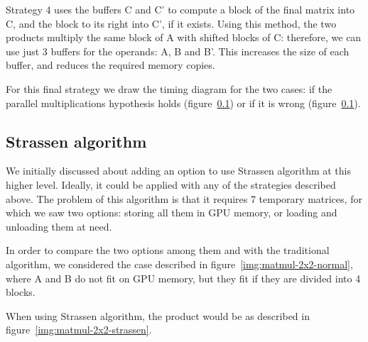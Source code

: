 Strategy 4 uses the buffers C and C' to compute a block of the final matrix into C, and the block to its right into C', if it exists.
Using this method, the two products multiply the same block of A with shifted blocks of C: therefore, we can use just 3 buffers for the operands: A, B and B'.
This increases the size of each buffer, and reduces the required memory copies.

For this final strategy we draw the timing diagram for the two cases: if the parallel multiplications hypothesis holds (figure~\ref{}) or if it is wrong (figure~\ref{}).

\subsection{Strassen algorithm}

We initially discussed about adding an option to use Strassen algorithm at this higher level.
Ideally, it could be applied with any of the strategies described above.
The problem of this algorithm is that it requires 7 temporary matrices, for which we saw two options: storing all them in GPU memory, or loading and unloading them at need.

In order to compare the two options among them and with the traditional algorithm, we considered the case described in figure~\ref{img:matmul-2x2-normal}, where A and B do not fit on GPU memory, but they fit if they are divided into 4 blocks.

When using Strassen algorithm, the product would be as described in figure~\ref{img:matmul-2x2-strassen}.

